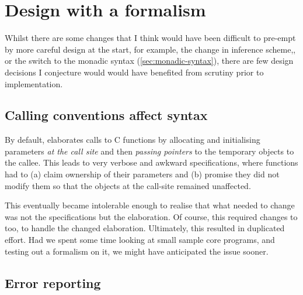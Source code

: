 \section{Design with a formalism}

Whilst there are some changes that I think would have been difficult to
pre-empt by more careful design at the start, for example, the change in
inference
scheme,, or the switch to the monadic syntax
(\cref{sec:monadic-syntax}), there are few design decisions I conjecture would
would have benefited from scrutiny prior to implementation.

\subsection{Calling conventions affect syntax}

By default,  elaborates calls to C functions by allocating and
initialising parameters \emph{at the call site} and then \emph{passing
pointers} to the temporary objects to the callee. This leads to very verbose
and awkward specifications, where functions had to (a) claim ownership of their
parameters and (b) promise they did not modify them so that the objects at the
call-site remained unaffected.

This eventually became intolerable enough to realise that what needed to change
was not the specifications but the
elaboration. Of course, this required changes to 
too, to handle the changed elaboration. Ultimately, this resulted in
duplicated effort. Had we spent some time looking at small sample core
programs, and testing out a formalism on it, we might have anticipated the
issue sooner.


\subsection{Error reporting}

